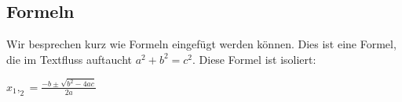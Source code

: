 \subsection{Formeln}
    Wir besprechen kurz wie Formeln eingefügt werden können.
    Dies ist eine Formel, die im Textfluss auftaucht $a^{2} + b^{2} = c^{2}$.
    Diese Formel ist isoliert:
    \begin{center}
        $x_1,_2 = \frac{-b \pm \sqrt{b^2 - 4ac}}{2a}$
    \end{center}